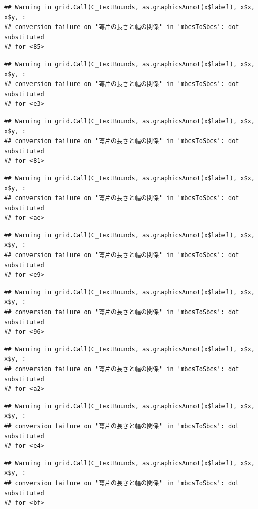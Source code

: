 \documentclass[
]{book}
\begin{document}
\begin{verbatim}
## Warning in grid.Call(C_textBounds, as.graphicsAnnot(x$label), x$x, x$y, :
## conversion failure on '萼片の長さと幅の関係' in 'mbcsToSbcs': dot substituted
## for <85>
\end{verbatim}

\begin{verbatim}
## Warning in grid.Call(C_textBounds, as.graphicsAnnot(x$label), x$x, x$y, :
## conversion failure on '萼片の長さと幅の関係' in 'mbcsToSbcs': dot substituted
## for <e3>
\end{verbatim}

\begin{verbatim}
## Warning in grid.Call(C_textBounds, as.graphicsAnnot(x$label), x$x, x$y, :
## conversion failure on '萼片の長さと幅の関係' in 'mbcsToSbcs': dot substituted
## for <81>
\end{verbatim}

\begin{verbatim}
## Warning in grid.Call(C_textBounds, as.graphicsAnnot(x$label), x$x, x$y, :
## conversion failure on '萼片の長さと幅の関係' in 'mbcsToSbcs': dot substituted
## for <ae>
\end{verbatim}

\begin{verbatim}
## Warning in grid.Call(C_textBounds, as.graphicsAnnot(x$label), x$x, x$y, :
## conversion failure on '萼片の長さと幅の関係' in 'mbcsToSbcs': dot substituted
## for <e9>
\end{verbatim}

\begin{verbatim}
## Warning in grid.Call(C_textBounds, as.graphicsAnnot(x$label), x$x, x$y, :
## conversion failure on '萼片の長さと幅の関係' in 'mbcsToSbcs': dot substituted
## for <96>
\end{verbatim}

\begin{verbatim}
## Warning in grid.Call(C_textBounds, as.graphicsAnnot(x$label), x$x, x$y, :
## conversion failure on '萼片の長さと幅の関係' in 'mbcsToSbcs': dot substituted
## for <a2>
\end{verbatim}

\begin{verbatim}
## Warning in grid.Call(C_textBounds, as.graphicsAnnot(x$label), x$x, x$y, :
## conversion failure on '萼片の長さと幅の関係' in 'mbcsToSbcs': dot substituted
## for <e4>
\end{verbatim}

\begin{verbatim}
## Warning in grid.Call(C_textBounds, as.graphicsAnnot(x$label), x$x, x$y, :
## conversion failure on '萼片の長さと幅の関係' in 'mbcsToSbcs': dot substituted
## for <bf>
\end{verbatim}
\end{document}

